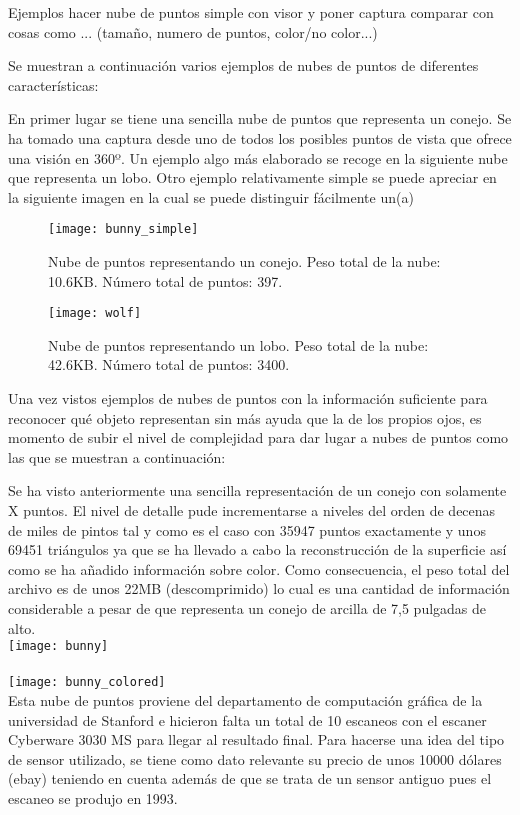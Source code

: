 Ejemplos
hacer nube de puntos simple con visor y poner captura
comparar con cosas como ... (tamaño, numero de puntos, color/no color...)


Se muestran a continuación varios ejemplos de nubes de puntos de diferentes características:

En primer lugar se tiene una sencilla nube de puntos que representa un conejo. Se ha tomado una captura desde uno de todos los posibles puntos de vista que ofrece una visión en 360º.
Un ejemplo algo más elaborado se recoge en la siguiente nube que representa un lobo. 
Otro ejemplo relativamente simple se puede apreciar en la siguiente imagen en la cual se puede distinguir fácilmente un(a)


\begin{figure}[!htb]
  \texttt{[image: bunny\_simple]}
  \caption{Nube de puntos representando un conejo.
  Peso total de la nube: 10.6KB.
  Número total de puntos: 397.}\label{fig:bunny}
\endminipage\hfill
{}
  \texttt{[image: wolf]}
  \caption{Nube de puntos representando un lobo.
  Peso total de la nube: 42.6KB.
  Número total de puntos: 3400.}\label{fig:wolf}
\endminipage\hfill
\end{figure}




Una vez vistos ejemplos de nubes de puntos con la información suficiente para reconocer qué objeto representan sin más ayuda que la de los propios ojos, es momento de subir el nivel de complejidad para dar lugar a nubes de puntos como las que se muestran a continuación:

Se ha visto anteriormente una sencilla representación de un conejo con solamente X puntos. El nivel de detalle pude incrementarse a niveles del orden de decenas de miles de pintos tal y como es el caso con 35947 puntos exactamente y unos 69451 triángulos ya que se ha llevado a cabo la reconstrucción de la superficie así como se ha añadido información sobre color. 
Como consecuencia, el peso total del archivo es de unos 22MB (descomprimido) lo cual es una cantidad de información considerable a pesar de que representa un conejo de arcilla de 7,5 pulgadas de alto.
\\
\texttt{[image: bunny]}
\\
\\
\texttt{[image: bunny\_colored]}
\\
Esta nube de puntos proviene del departamento de computación gráfica de la universidad de Stanford e hicieron falta un total de 10 escaneos con el escaner Cyberware 3030 MS para llegar al resultado final. Para hacerse una idea del tipo de sensor utilizado, se tiene como dato relevante su precio de unos 10000 dólares (ebay) teniendo en cuenta además de que se trata de un sensor antiguo pues el escaneo se produjo en 1993.

